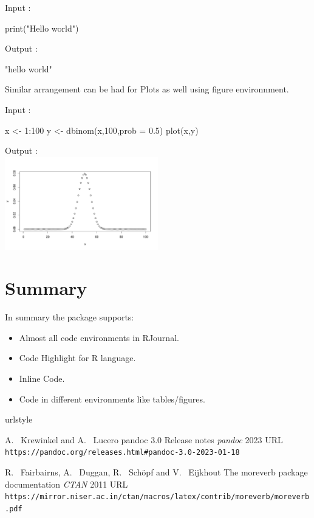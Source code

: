 \begin{Schunk}
Input :
\begin{Sinput}
print("Hello world")
\end{Sinput}
Output :
\begin{Soutput}
[1] "hello world"
\end{Soutput}
\end{Schunk}

Similar arrangement can be had for Plots as well using figure environnment.

\begin{Schunk}
Input :
\begin{Sinput}
x <- 1:100
y <- dbinom(x,100,prob = 0.5)
plot(x,y)
\end{Sinput}
Output :\\
\includegraphics[width=0.5\textwidth]{binom}
\end{Schunk}


\section{Summary}

In summary the  package supports:
\begin{itemize}
\item Almost all code environments in RJournal.
\item Code Highlight for R language.
\item Inline Code.
\item Code in different environments like tables/figures.
\end{itemize}



\begin{thebibliography}{2}
    \providecommand{\natexlab}[1]{#1}
    \providecommand{\url}[1]{\texttt{#1}}
    \expandafter\ifx\csname urlstyle\endcsname\relax
      \providecommand{\doi}[1]{doi: #1}\else
      \providecommand{\doi}{doi: \begingroup \urlstyle{rm}\Url}\fi

A.~ Krewinkel and A.~ Lucero
\newblock pandoc 3.0 Release notes
\newblock \emph{pandoc}  2023
\newblock URL \url{https://pandoc.org/releases.html#pandoc-3.0-2023-01-18}

R.~ Fairbairns, A.~ Duggan, R.~ Schöpf and V.~ Eijkhout
\newblock The moreverb package documentation
\newblock \emph{CTAN}  2011
\newblock URL \url{https://mirror.niser.ac.in/ctan/macros/latex/contrib/moreverb/moreverb.pdf}

\end{thebibliography}


\address{%
Abhishek Ulayil\\
Student, Institute of Actuaries of India\\%
Mumbai, India\\
ORCiD: 0009-0000-6935-8690\\
}
